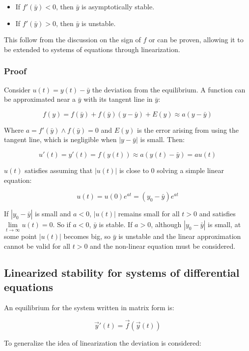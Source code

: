 	\begin{multicols}{2}
		\begin{itemize}
			\item If $f'(\bar{y})<0$, then $\bar{y}$ is asymptotically stable.
			\item If $f'(\bar{y})>0$, then $\bar{y}$ is unstable.
		\end{itemize}
	\end{multicols}

	This follow from the discussion on the sign of $f$ or can be proven, allowing it to be extended to systems of equations through linearization.

		\subsubsection{Proof}
		Consider $u(t)=y(t)-\bar{y}$ the deviation from the equilibrium.
		A function can be approximated near a $\bar{y}$ with its tangent line in $\bar{y}$:

		$$f(y) = f(\bar{y})+f(\bar{y})(y-\bar{y}) + E(y)\approx a(y-\bar{y})$$

		Where $a=f'(\bar{y})\land f(\bar{y}) = 0$ and $E(y)$ is the error arising from using the tangent line, which is negligible when $|y-\bar{y}|$ is small.
		Then:

		$$u'(t) = y'(t) = f(y(t))\approx a(y(t)-\bar{y})=au(t)$$

		$u(t)$ satisfies assuming that $|u(t)|$ is close to $0$ solving a simple linear equation:

		$$u(t) = u(0)e^{at} = (y_0-\bar{y})e^{at}$$

		If $|y_0-\bar{y}|$ is small and $a<0$, $|u(t)|$ remains small for all $t>0$ and satisfies $\lim\limits_{t\rightarrow\infty}u(t)=0$.
		So if $a<0$, $\bar{y}$ is stable.
		If $a>0$, although $|y_0-\bar{y}|$ is small, at some point $|u(t)|$ becomes big, so $\bar{y}$ is unstable and the linear approximation cannot be valid for all $t>0$ and the non-linear equation must be considered.

	\subsection{Linearized stability for systems of differential equations}
	An equilibrium for the system written in matrix form is:

	$$\vec{y}'(t) = \vec{f}(\vec{y}(t))$$

	To generalize the idea of linearization the deviation is considered:

